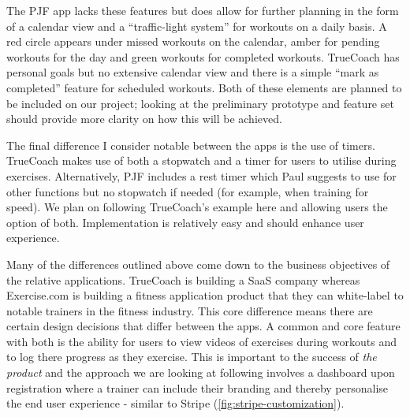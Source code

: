 The PJF app lacks these features but does allow for further planning in the form of a calendar view and 
a ``traffic-light system'' for workouts on a daily basis. A red circle appears under missed workouts
on the calendar, amber for pending workouts for the day and green workouts for completed workouts. TrueCoach
has personal goals but no extensive calendar view and there is a simple ``mark as completed'' feature
for scheduled workouts. Both of these elements are planned to be included on our project; looking at the preliminary
prototype  and feature set  should provide more clarity on how this will be achieved.
\par
The final difference I consider notable between the apps is the use of timers. TrueCoach makes use of both
a stopwatch and a timer for users to utilise during exercises. Alternatively, PJF includes a rest timer
which Paul suggests to use for other functions but no stopwatch if needed (for example, when training for speed).
We plan on following TrueCoach's example here and allowing users the option of both. Implementation is relatively easy
 and should enhance user experience.
\par 
Many of the differences outlined above come down to the business objectives of the relative applications. TrueCoach is building a
SaaS company whereas Exercise.com is building a fitness application product that they can
white-label to notable trainers in the fitness industry. This core difference means there are certain
design decisions that differ between the apps. A common and core feature with both is the 
ability for users to view videos of exercises during workouts and to log there progress as they exercise.
This is important to the success of \textit{the product} and the approach we are looking at following involves
a dashboard upon registration where a trainer can include their branding and thereby personalise the end user
experience - similar to Stripe (\cref{fig:stripe-customization}).
\pagebreak

